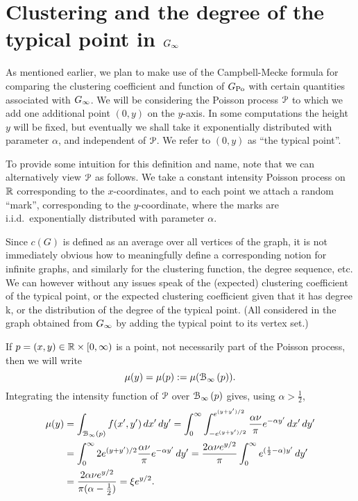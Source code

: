 


\section{Clustering and the degree of the typical point in $G_{\infty}$\label{sec:Ginf}\label{sec:asymptotics_average_clustering_ast_P}}


As mentioned earlier, we plan to make use of the Campbell-Mecke formula for comparing the clustering coefficient and function of $G_{\text{Po}}$ with certain quantities associated with $G_{\infty}$. We will be considering the Poisson process ${\mathcal P}$ to which we add one additional point $(0,y)$ on the $y$-axis. In some computations the height $y$ will be fixed, but eventually we shall take it exponentially distributed with parameter $\alpha$, and independent of ${\mathcal P}$.
We refer to $(0,y)$ as ``the typical point''.

To provide some intuition for this definition and name, note that we can alternatively view ${\mathcal P}$ as follows. 
We take a constant intensity Poisson process on ${\mathbb R}$ corresponding to the $x$-coordinates, and to each point
we attach a random ``mark'', corresponding to the $y$-coordinate, where the marks are i.i.d.~exponentially distributed with parameter $\alpha$.


Since $c(G)$ is defined as an average over all vertices of the graph, it is not immediately obvious how to meaningfully define a corresponding notion for infinite graphs, and similarly for the clustering function, the degree sequence, etc.
We can however without any issues speak of the (expected) clustering coefficient of the typical point, or the expected clustering coefficient given that it has degree k, or the distribution of the degree of the typical point. (All considered in the graph obtained from $G_{\infty}$ by adding the typical point to its vertex set.)

If $p = (x,y) \in {\mathbb R}\times[0,\infty)$ is a point, not necessarily part of the Poisson process, then we will write
\[ 
	\mu(y) = \mu(p) := \mu({\mathcal B}_{\infty}\left(p\right)).
\]
Integrating the intensity function of ${\mathcal P}$ over ${\mathcal B}_{\infty}\left(p\right)$ gives, using $\alpha>\frac{1}{2}$,
\begin{align*}
	\mu(y) &= \int_{{\mathcal B}_{\infty}\left(p\right)} f(x',y') \, dx' \,d y'  
 		= \int_0^\infty \int_{-e^{(y+y')/2}}^{e^{(y+y')/2}} \frac{\alpha \nu}{\pi} e^{-\alpha y'} \, dx' \, dy' \\
	&= \int_0^\infty 2 e^{(y+y')/2} \frac{\alpha \nu}{\pi} e^{-\alpha y'} \, dy' 
 		= \frac{2\alpha \nu e^{y/2}}{\pi} \int_0^\infty e^{(\frac12-\alpha)y'} \, dy' \\
	&= \frac{2\alpha \nu e^{y/2}}{\pi(\alpha-\frac12)} = \xi e^{y/2}.
\end{align*}


